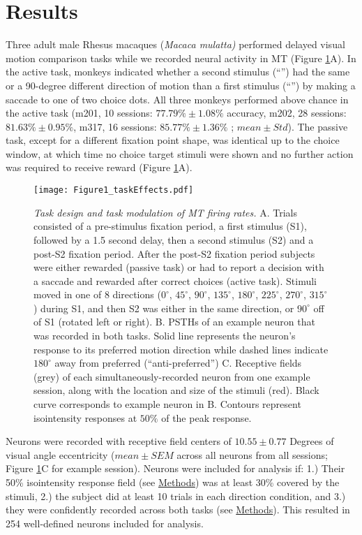 \section*{Results}
Three adult male Rhesus macaques (\textit{Macaca mulatta)} performed delayed visual motion comparison tasks while we recorded neural activity in MT (Figure \ref{fig:fig1}A). In the active task, monkeys indicated whether a second stimulus (``\test'') had the same or a 90-degree different direction of motion than a first stimulus (``\sample'') by making a saccade to one of two choice dots. All three monkeys performed above chance in the active task (m201, 10 sessions: $77.79\% \pm 1.08\%$ accuracy, m202, 28 sessions: $81.63\% \pm 0.95\%$, m317, 16 sessions: $85.77\% \pm 1.36\%$ ; $mean \pm Std$). The passive task, except for a different fixation point shape, was identical up to the choice window, at which time no choice target stimuli were shown and no further action was required to receive reward (Figure \ref{fig:fig1}A). 

\begin{figure}
	\centerline{\texttt{[image: Figure1\_taskEffects.pdf]}}
	\caption{ \textit{Task design and task modulation of MT firing rates.} A. Trials consisted of a pre-stimulus fixation period, a first stimulus  (S1), followed by a 1.5 second delay, then a second stimulus (S2) and a post-S2 fixation period. After the post-S2 fixation period subjects were either rewarded (passive task) or had to report a decision with a saccade and rewarded after correct choices (active task). Stimuli moved in one of 8 directions ($0^\circ$, $45^\circ$, $90^\circ$, $135^\circ$, $180^\circ$, $225^\circ$, $270^\circ$, $315^\circ$) during S1, and then S2 was either in the same direction, or $90^\circ$ off of S1 (rotated left or right). B. PSTHs of an example neuron that was recorded in both tasks. Solid line represents the neuron’s response to its preferred motion direction while dashed lines indicate $180^\circ$ away from preferred (“anti-preferred”) C. Receptive fields (grey) of each simultaneously-recorded neuron from one example session, along with the location and size of the stimuli (red). Black curve corresponds to example neuron in B. Contours represent isointensity responses at $50\%$ of the peak response. }
	\captionsetup{singlelinecheck = false, font=footnotesize, labelsep=space, width=172mm}
	\label{fig:fig1}
\end{figure}

Neurons were recorded with receptive field centers of $10.55 \pm 0.77$ Degrees of visual angle eccentricity ($mean \pm SEM$ across all neurons from all sessions; Figure \ref{fig:fig1}C for example session). Neurons were included for analysis if: 1.) Their 50\% isointensity response field (see \hyperref[{sec:methods}]{Methods}) was at least 30\% covered by the stimuli, 2.) the subject did at least 10 trials in each direction condition, and 3.) they were confidently recorded across both tasks (see \hyperref[{sec:methods}]{Methods}). This resulted in 254 well-defined neurons included for analysis. 

